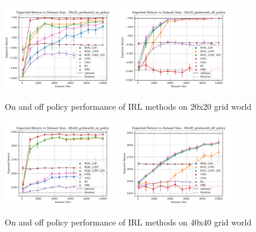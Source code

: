 \documentclass[10pt]{article}
\begin{document}
\begin{figure}[htbp]
    \label{fig:20x20_results}
	\centering
	\includegraphics[width=0.45\textwidth]{../src/plots/returns/20x20_gridworld_on_policy_returns.pdf}
	\includegraphics[width=0.45\textwidth]{../src/plots/returns/20x20_gridworld_off_policy_returns.pdf}
	\caption{On and off policy performance of IRL methods on 20x20 grid world}
	\label{fig:off_policy_vs_on_20}
\end{figure}

\begin{figure}[htbp]
    \label{fig:40x40_results}
	\centering
	\includegraphics[width=0.45\textwidth]{../src/plots/returns/40x40_gridworld_on_policy_returns.pdf}
	\includegraphics[width=0.45\textwidth]{../src/plots/returns/40x40_gridworld_off_policy_returns.pdf}
	\caption{On and off policy performance of IRL methods on 40x40 grid world}
	\label{fig:off_policy_vs_on_40}
\end{figure}
\end{document}
